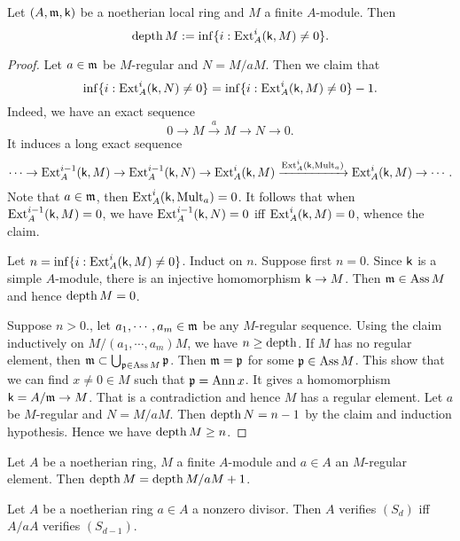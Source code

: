     \begin{proposition}\label{prop: depth equals to grade}
        Let $(A, {\mathfrak{m}}, {\mathsf{k}})$ be a noetherian local ring and $M$ a finite $A$-module.
        Then 
        \[ \operatorname{depth} M := \inf \{ i : \operatorname{Ext}^i_A({\mathsf{k}},M) \neq 0 \}. \]
    \end{proposition}
    \begin{proof}
        Let $a \in {\mathfrak{m}}$ be $M$-regular and $N = M/aM$.
        Then we claim that
        \[ \inf \{ i: \operatorname{Ext}^i_A({\mathsf{k}},N) \neq 0 \} = \inf \{ i : \operatorname{Ext}^i_A({\mathsf{k}},M) \neq 0 \} - 1. \]
        Indeed, we have an exact sequence
        \[ 0 \to M \xrightarrow{a} M \to N \to 0. \]
        It induces a long exact sequence
        \[ \cdots \to \operatorname{Ext}^{i-1}_A({\mathsf{k}},M) \to \operatorname{Ext}^{i-1}_A({\mathsf{k}},N) \to \operatorname{Ext}^i_A({\mathsf{k}},M) \xrightarrow{\operatorname{Ext}^i_A({\mathsf{k}},\operatorname{Mult}_a)} \operatorname{Ext}^i_A({\mathsf{k}},M) \to \cdots. \]
        Note that $a \in {\mathfrak{m}}$, then $\operatorname{Ext}^i_A({\mathsf{k}},\operatorname{Mult}_a) = 0$.
        It follows that when $\operatorname{Ext}^{i-1}_A({\mathsf{k}},M) = 0$, we have $\operatorname{Ext}^{i-1}_A({\mathsf{k}},N) = 0$ iff $\operatorname{Ext}^i_A({\mathsf{k}},M) = 0$, whence the claim.

        Let $n = \inf \{ i : \operatorname{Ext}^i_A({\mathsf{k}},M) \neq 0 \}$.
        Induct on $n$.
        Suppose first $n = 0$.
        Since ${\mathsf{k}}$ is a simple $A$-module, there is an injective homomorphism ${\mathsf{k}} \to M$.
        Then ${\mathfrak{m}} \in \operatorname{Ass} M$ and hence $\operatorname{depth} M = 0$.
        
        Suppose $n > 0$., let $a_1,\cdots,a_m \in {\mathfrak{m}}$ be any $M$-regular sequence.
        Using the claim inductively on $M/(a_1,\cdots,a_m)M$, we have $n \geq \operatorname{depth}$.
        If $M$ has no regular element, then ${\mathfrak{m}} \subset \bigcup_{{\mathfrak{p}} \in \operatorname{Ass} M} {\mathfrak{p}}$.
        Then ${\mathfrak{m}} = {\mathfrak{p}}$ for some ${\mathfrak{p}} \in \operatorname{Ass} M$.
        This show that we can find $x \neq 0 \in M$ such that ${\mathfrak{p}} = \operatorname{Ann} x$.
        It gives a homomorphism ${\mathsf{k}} = A/{\mathfrak{m}} \to M$.
        That is a contradiction and hence $M$ has a regular element.
        Let $a$ be $M$-regular and $N = M/aM$.
        Then $\operatorname{depth} N = n-1$ by the claim and induction hypothesis.
        Hence we have $\operatorname{depth} M \geq n$.
    \end{proof}

    \begin{corollary}\label{cor: induction on depth}
        Let $A$ be a noetherian ring, $M$ a finite $A$-module and $a \in A$ an $M$-regular element.
        Then $\operatorname{depth} M = \operatorname{depth} M/aM + 1$.
    \end{corollary}

    \begin{corollary}\label{cor: induction on S_d conditions}
        Let $A$ be a noetherian ring $a \in A$ a nonzero divisor.
        Then $A$ verifies $(S_d)$ iff $A/aA$ verifies $(S_{d-1})$.
    \end{corollary}


